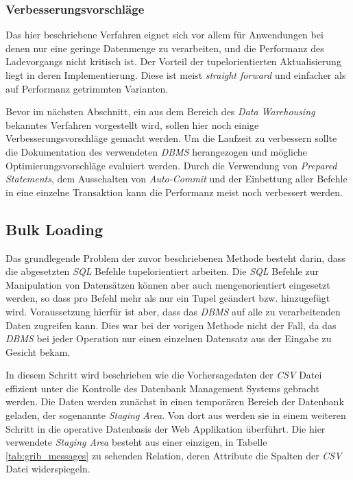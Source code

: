 \subsubsection{Verbesserungsvorschläge}
Das hier beschriebene Verfahren eignet sich vor allem für Anwendungen
bei denen nur eine geringe Datenmenge zu verarbeiten, und die
Performanz des Ladevorgangs nicht kritisch ist. Der Vorteil der
tupelorientierten Aktualisierung liegt in deren Implementierung. Diese
ist meist \textit{straight forward} und einfacher als auf Performanz
getrimmten Varianten.

Bevor im nächsten Abschnitt, ein aus dem Bereich des \textit{Data
  Warehousing} bekanntes Verfahren vorgestellt wird, sollen hier noch
einige Verbesserungsvorschläge gemacht werden. Um die Laufzeit zu
verbessern sollte die Dokumentation des verwendeten \textit{DBMS}
herangezogen und mögliche Optimierungsvorschläge evaluiert
werden. Durch die Verwendung von \textit{Prepared Statements}, dem
Ausschalten von \textit{Auto-Commit} und der Einbettung aller Befehle
in eine einzelne Transaktion kann die Performanz meist noch verbessert
werden.

\subsection{Bulk Loading}

Das grundlegende Problem der zuvor beschriebenen Methode besteht
darin, dass die abgesetzten \textit{SQL} Befehle tupelorientiert
arbeiten. Die \textit{SQL} Befehle zur Manipulation von Datensätzen
können aber auch mengenorientiert eingesetzt werden, so dass pro
Befehl mehr als nur ein Tupel geändert bzw. hinzugefügt
wird. Voraussetzung hierfür ist aber, dass das \textit{DBMS} auf alle
zu verarbeitenden Daten zugreifen kann. Dies war bei der vorigen
Methode nicht der Fall, da das \textit{DBMS} bei jeder Operation nur
einen einzelnen Datensatz aus der Eingabe zu Gesicht bekam.

In diesem Schritt wird beschrieben wie die Vorhersagedaten der
\textit{CSV} Datei effizient unter die Kontrolle des Datenbank
Management Systems gebracht werden. Die Daten werden zunächst in einen
temporären Bereich der Datenbank geladen, der sogenannte
\textit{Staging Area}. Von dort aus werden sie in einem weiteren
Schritt in die operative Datenbasis der Web Applikation überführt. Die
hier verwendete \textit{Staging Area} besteht aus einer einzigen, in
Tabelle \ref{tab:grib_messages} zu sehenden Relation, deren Attribute
die Spalten der \textit{CSV} Datei widerspiegeln.

